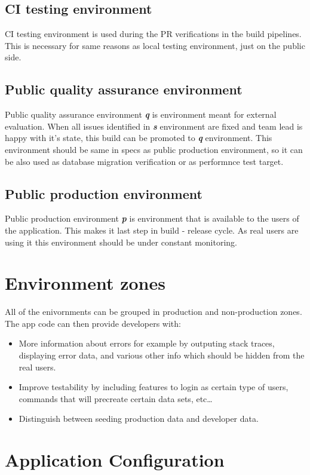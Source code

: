\documentclass[lang=en,color=green]{elegantbook}
\newcommand{\bi}[1]{\textit{\textbf{#1}}}
\begin{document}
\subsection{CI testing environment}
CI testing environment is used during the PR verifications in the build
pipelines. This is necessary for same reasons as local testing environment,
just on the public side.

\subsection{Public quality assurance environment}
Public quality assurance environment \bi{q} is environment meant
for external evaluation. When all issues identified in \bi{s} environment
are fixed and team lead is happy with it's state, this build can be promoted
to \bi{q} environment. This environment should be same in specs as
public production environment, so it can be also used as database
migration verification or as performnce test target.

\subsection{Public production environment}
Public production environment \bi{p} is environment that is available to the
users of the application. This makes it last step in build - release cycle.
As real users are using it this environment should be under constant monitoring.

\section{Environment zones}
All of the enivornments can be grouped in production and non-production zones.
The app code can then provide developers with:
\begin{itemize}
    \item More information about errors for example by outputing
          stack traces, displaying error data, and various other info which should be
          hidden from the real users.
    \item Improve testability by including features to login as certain type
          of users, commands that will precreate certain data sets, etc\dots
    \item Distinguish between seeding production data and developer data.
\end{itemize}


\section{Application Configuration}
\end{document}
